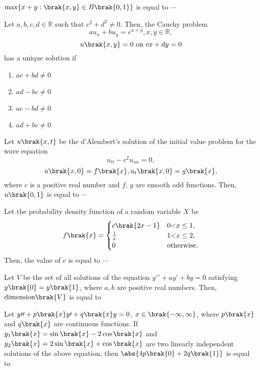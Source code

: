     \item $\max \{x+y : \brak{x, y} \in B\brak{0,1}\}$ is equal to $\cdots$



    \item Let $a, b, c, d \in \mathbb{R}$ such that $c^2 + d^2 \neq 0$. Then, the Cauchy problem
    $$a u_x + b u_y = e^{x+y},  x, y \in \mathbb{R},$$
    $$u\brak{x,y} = 0 \text{ on } cx + dy = 0$$
    has a unique solution if
    \begin{enumerate}
        \item $a c + b d \neq 0$
        \item $a d - b c \neq 0$
        \item $a c - b d \neq 0$
        \item $a d + b c \neq 0$
    \end{enumerate}


    \item Let $u\brak{x, t}$ be the d'Alembert's solution of the initial value problem for the wave equation
    $$u_{tt} - c^2 u_{xx} = 0,$$
    $$u\brak{x, 0} = f\brak{x}, u_t\brak{x, 0} = g\brak{x},$$
    where $c$ is a positive real number and $f$, $g$ are smooth odd functions. Then, $u\brak{0,1}$ is equal to $\cdots$

    \item Let the probability density function of a random variable $X$ be
    $$f\brak{x} = \begin{cases} 
      c\brak{2x - 1} & 0 \text{\textless} x \leq 1, \\
      \frac{1}{x} & 1 \text{\textless} x \leq 2, \\
      0 & \text{otherwise}.
   \end{cases}$$
    Then, the value of $c$ is equal to $\cdots$

    \item Let $V$ be the set of all solutions of the equation $y{\prime}{\prime} + a y{\prime} + b y = 0$ satisfying $y\brak{0} = y\brak{1}$, where $a, b$ are positive real numbers. Then, $\text{dimension}\brak{V}$ is equal to

    \item Let $y{\prime}{\prime} + p\brak{x} y{\prime} + q\brak{x}y = 0$, $x \in \brak{-\infty, \infty}$, where $p\brak{x}$ and $q\brak{x}$ are continuous functions. If $y_1\brak{x} = \sin\brak{x} - 2 \cos\brak{x}$ and $y_2\brak{x} = 2 \sin\brak{x} + \cos\brak{x}$ are two linearly independent solutions of the above equation, then $\abs{ 4p\brak{0} + 2 q\brak{1} }$ is equal to

